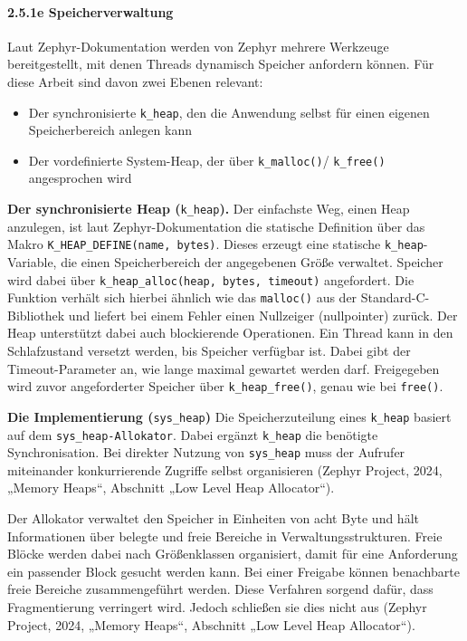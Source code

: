 \paragraph*{\textbf{2.5.1e Speicherverwaltung}}
Laut Zephyr-Dokumentation werden von Zephyr mehrere Werkzeuge bereitgestellt, mit denen Threads dynamisch Speicher anfordern können. Für diese Arbeit sind davon zwei Ebenen relevant:

\begin{itemize}
\item Der synchronisierte \lstinline[style=fileinline]|k_heap|, den die Anwendung selbst für einen eigenen Speicherbereich anlegen kann
\item Der vordefinierte System-Heap, der über \lstinline[style=fileinline]|k_malloc()|/ \lstinline[style=fileinline]|k_free()| angesprochen wird
\end{itemize}
\textbf{Der synchronisierte Heap (}\lstinline[style=fileinline]|k_heap|\textbf{).} Der einfachste Weg, einen Heap anzulegen, ist laut Zephyr-Dokumentation die statische Definition über das Makro \lstinline[style=fileinline]|K_HEAP_DEFINE(name, bytes)|. Dieses erzeugt eine statische \lstinline[style=fileinline]|k_heap|-Variable, die einen Speicherbereich der angegebenen Größe verwaltet. Speicher wird dabei über \lstinline[style=fileinline]|k_heap_alloc(heap, bytes, timeout)| angefordert. Die Funktion verhält sich hierbei ähnlich wie das \lstinline[style=fileinline]|malloc()| aus der Standard-C-Bibliothek und liefert bei einem Fehler einen Nullzeiger (nullpointer) zurück. Der Heap unterstützt dabei auch blockierende Operationen. Ein Thread kann in den Schlafzustand versetzt werden, bis Speicher verfügbar ist. Dabei gibt der Timeout-Parameter an, wie lange maximal gewartet werden darf. Freigegeben wird zuvor angeforderter Speicher über \lstinline[style=fileinline]|k_heap_free()|, genau wie bei \lstinline[style=fileinline]|free()|.

\textbf{Die Implementierung (}\lstinline[style=fileinline]|sys_heap|\textbf{)} Die Speicherzuteilung eines \lstinline[style=fileinline]|k_heap| basiert auf dem \lstinline[style=fileinline]|sys_heap-Allokator|. Dabei ergänzt \lstinline[style=fileinline]|k_heap| die benötigte Synchronisation. Bei direkter Nutzung von \lstinline[style=fileinline]|sys_heap| muss der Aufrufer miteinander konkurrierende Zugriffe selbst organisieren (Zephyr Project, 2024, „Memory Heaps“, Abschnitt „Low Level Heap Allocator“).

Der Allokator verwaltet den Speicher in Einheiten von acht Byte und hält Informationen über belegte und freie Bereiche in Verwaltungsstrukturen. Freie Blöcke werden dabei nach Größenklassen organisiert, damit für eine Anforderung ein passender Block gesucht werden kann. Bei einer Freigabe können benachbarte freie Bereiche zusammengeführt werden. Diese Verfahren sorgend dafür, dass Fragmentierung verringert wird. Jedoch schließen sie dies nicht aus (Zephyr Project, 2024, „Memory Heaps“, Abschnitt „Low Level Heap Allocator“).

